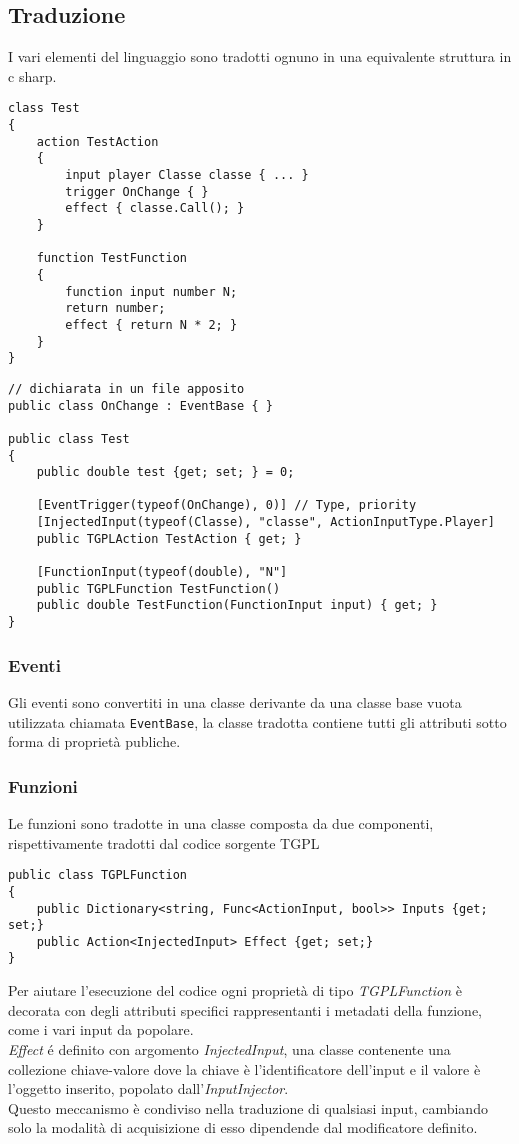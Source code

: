 \subsection{Traduzione}
I vari elementi del linguaggio sono tradotti ognuno in una equivalente 
struttura in c sharp.

\begin{lstlisting}[language=tgpl_small, caption=Codice in TGPL]
class Test
{
    action TestAction
    {
        input player Classe classe { ... }
        trigger OnChange { }
        effect { classe.Call(); }
    }

    function TestFunction
    {
        function input number N;
        return number;
        effect { return N * 2; }
    }
}
\end{lstlisting}
 
\begin{lstlisting}[style=sharpc_small, caption=Traduzione in CSharp]
// dichiarata in un file apposito
public class OnChange : EventBase { } 

public class Test
{
    public double test {get; set; } = 0;

    [EventTrigger(typeof(OnChange), 0)] // Type, priority
    [InjectedInput(typeof(Classe), "classe", ActionInputType.Player]
    public TGPLAction TestAction { get; }

    [FunctionInput(typeof(double), "N"]
    public TGPLFunction TestFunction()
    public double TestFunction(FunctionInput input) { get; }
}
\end{lstlisting}

\subsubsection{Eventi}
Gli eventi sono convertiti in una classe derivante da una classe base vuota utilizzata chiamata \lstinline|EventBase|,
la classe tradotta contiene tutti gli attributi sotto forma di proprietà publiche.

\subsubsection{Funzioni}
Le funzioni sono tradotte in una classe composta da due componenti, rispettivamente tradotti dal codice sorgente TGPL
\begin{lstlisting}[style=sharpc_small]
public class TGPLFunction
{
    public Dictionary<string, Func<ActionInput, bool>> Inputs {get; set;}
    public Action<InjectedInput> Effect {get; set;}
}
\end{lstlisting}
Per aiutare l'esecuzione del codice ogni proprietà di tipo \textit{TGPLFunction} è decorata  con degli attributi specifici 
rappresentanti i metadati della funzione, come i vari input da popolare. \\
\textit{Effect} é definito con argomento \textit{InjectedInput}, 
una classe contenente una collezione chiave-valore dove la chiave è l'identificatore dell'input
e il valore è l'oggetto inserito, popolato dall'\textit{InputInjector}. \\
Questo meccanismo è condiviso nella traduzione di qualsiasi input, cambiando solo la modalità
di acquisizione di esso dipendende dal modificatore definito.


